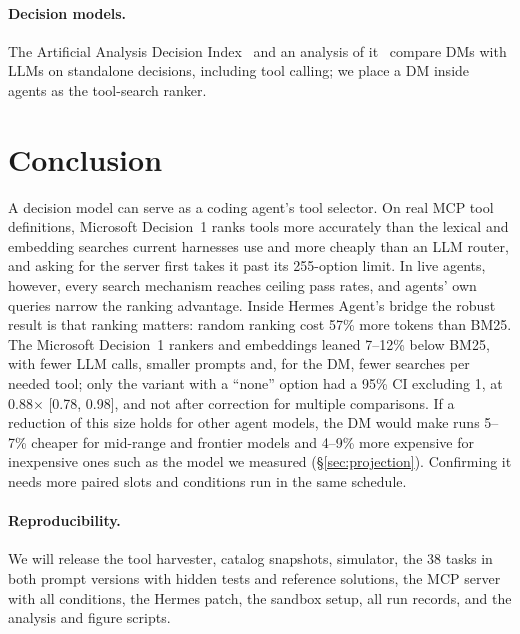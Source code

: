 \documentclass[11pt]{article}
\begin{document}
\paragraph{Decision models.} The Artificial Analysis Decision Index~\citep{aa2026decisionindex} and an analysis of
it~\citep{olson2026decision} compare DMs with LLMs on standalone decisions, including tool calling; we place a DM
inside agents as the tool-search ranker.

\section{Conclusion}\label{sec:conclusion}
A decision model can serve as a coding agent's tool selector. On real MCP tool definitions, Microsoft Decision~1
ranks tools more accurately than the lexical and embedding searches current harnesses use and more cheaply than
an LLM router, and asking for the server first takes it past its 255-option limit. In live agents, however, every
search mechanism reaches ceiling pass rates, and agents' own queries narrow the ranking advantage. Inside Hermes
Agent's bridge the robust result is that ranking matters: random ranking cost 57\% more tokens than BM25. The
Microsoft Decision~1 rankers and embeddings leaned 7--12\% below BM25, with fewer LLM calls, smaller prompts and,
for the DM, fewer searches per needed tool; only the variant with a ``none'' option had a 95\% CI excluding 1, at
0.88$\times$ [0.78, 0.98], and not after correction for multiple comparisons. If a reduction of this size holds
for other agent models, the DM would make runs 5--7\% cheaper for mid-range and frontier models and 4--9\% more
expensive for inexpensive ones such as the model we measured (\S\ref{sec:projection}). Confirming it needs more
paired slots and conditions run in the same schedule.

\paragraph{Reproducibility.} We will release the tool harvester, catalog snapshots, simulator, the 38 tasks in
both prompt versions with hidden tests and reference solutions, the MCP server with all conditions, the Hermes
patch, the sandbox setup, all run records, and the analysis and figure scripts.



\end{document}

